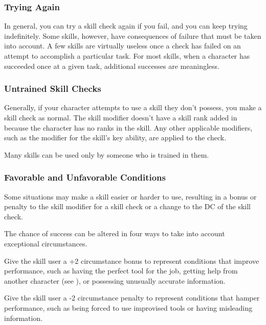 \begin{multicols}{2}

\subsubsection{Trying Again}

In general, you can try a skill check again if you fail, and you can keep trying indefinitely. Some skills, however, have consequences of failure that must be taken into account. A few skills are virtually useless once a check has failed on an attempt to accomplish a particular task. For most skills, when a character has succeeded once at a given task, additional successes are meaningless.

\subsubsection{Untrained Skill Checks}

Generally, if your character attempts to use a skill they don't possess, you make a skill check as normal. The skill modifier doesn't have a skill rank added in because the character has no ranks in the skill. Any other applicable modifiers, such as the modifier for the skill's key ability, are applied to the check.

Many skills can be used only by someone who is trained in them.

\subsubsection{Favorable and Unfavorable Conditions}

Some situations may make a skill easier or harder to use, resulting in a bonus or penalty to the skill modifier for a skill check or a change to the DC of the skill check.

The chance of success can be altered in four ways to take into account exceptional circumstances.

\begin{enumerate*}
	\item Give the skill user a +2 circumstance bonus to represent conditions that improve performance, such as having the perfect tool for the job, getting help from another character
	(see ), or possessing unusually accurate information. 
	
	\item Give the skill user a -2 circumstance penalty to represent conditions that hamper performance, such as being forced to use improvised tools or having misleading information.
	

\end{enumerate*}
\end{multicols}
